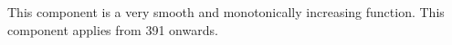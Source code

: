 This component is a very smooth and monotonically increasing function.
This component applies from  391 onwards.